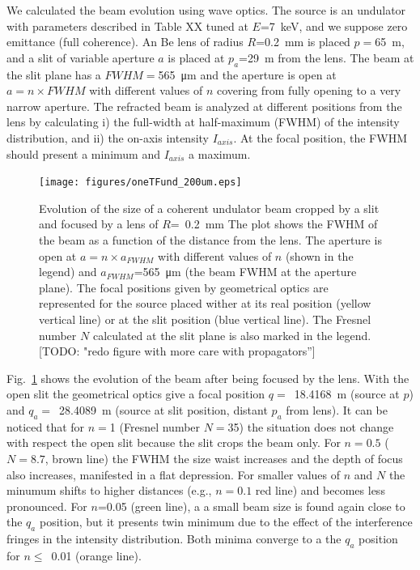\documentclass{iucr}              %
\newcommand{\todo}[1]{{\color{red}[TODO: "#1'']}}
\begin{document}
We calculated the beam evolution using wave optics. The source is an undulator with parameters described in Table XX tuned at $E$=7~keV, and we suppose zero emittance (full coherence). An Be lens of radius $R$=\SI{0.2}{\milli\meter} is placed $p=$\SI{65}{\meter}, and a slit of variable aperture $a$ is placed at $p_a$=\SI{29}{\meter} from the lens. The beam at the slit plane has a $FWHM=$\SI{565}{\micro\meter} and the aperture is open at $a = n \times FWHM$ with different values of $n$ covering from fully opening to a very narrow aperture. The refracted beam is analyzed at different positions from the lens by calculating i) the full-width at half-maximum (FWHM) of the intensity distribution, and ii) the on-axis intensity $I_{axis}$. At the focal position, the FWHM should present a minimum and $I_{axis}$ a maximum. 

\begin{figure}
    \centering
    \texttt{[image: figures/oneTFund\_200um.eps]}

    \caption{Evolution of the size of a coherent undulator beam cropped by a slit and focused by a lens of $R$=~\SI{0.2}{\milli\meter} 
    The plot shows the FWHM of the beam  as a function of the distance from the lens. The aperture is open at $a = n \times a_{FWHM}$ with different values of $n$ (shown in the legend) and $a_{FWHM}$=\SI{565}{\micro\meter} (the beam FWHM at the aperture plane). The focal positions given by geometrical optics are represented for the source placed wither at its real position (yellow vertical line) or at the slit position (blue vertical line).
    The Fresnel number $N$ calculated at the slit plane is also marked in the legend.
    \todo{redo figure with more care with propagators}
    }
    \label{fig:oneTFund}
\end{figure}

Fig.~\ref{fig:oneTFund} shows the evolution of the beam after being focused by the lens. With the open slit the geometrical optics give a focal position $q=$~\SI{18.4168}{\meter} (source at $p$) and $q_a=$~\SI{28.4089}{\meter} (source at slit position, distant $p_a$ from lens). It can be noticed that for $n=$1 (Fresnel number $N=$35) the situation does not change with respect the open slit because the slit crops the beam only. For $n=0.5$ ($N=8.7$, brown line) the FWHM the size waist increases and the depth of focus also increases, manifested in a flat depression. For smaller values of $n$ and $N$ the minumum shifts to higher distances (e.g., $n=0.1$ red line) and becomes less pronounced. For $n$=0.05 (green line), a a small beam size is found again close to the $q_a$ position, but it presents twin minimum due to the effect of the interference fringes in the intensity distribution. Both minima converge to a the $q_a$ position for $n\le$~0.01 (orange line). 
\end{document}
